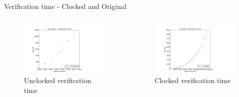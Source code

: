 \documentclass[11pt]{beamer}
\begin{document}
\begin{frame}{Verification time - Clocked and Original}
         \begin{columns}[t, totalwidth=1.02\textwidth]
             \begin{column}{0.50\linewidth}
\begin{figure}[!ht]
     \centering
     \includegraphics[scale=0.28]{figures/unclocked_verification_time.png}
     \caption{Unclocked verification time}
\end{figure}
             \end{column}

             \begin{column}{0.50\linewidth}
\begin{figure}[!ht]
     \centering
     \includegraphics[scale=0.28]{figures/clocked_verification_time.png}
     \caption{Clocked verification time}
\end{figure}
             \end{column}

         \end{columns}
\end{frame}
\end{document}
